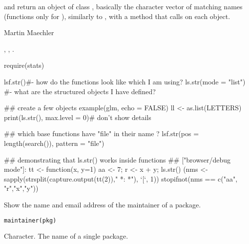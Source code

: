 %
\begin{Value}
 and  return an object of class
, basically the character vector of matching names
(functions only for ), similarly to
, with a  method that calls 
on each object.
\end{Value}
%
\begin{Author}\relax
Martin Maechler
\end{Author}
%
\begin{SeeAlso}\relax
{}, , .
\end{SeeAlso}
%
\begin{Examples}
\begin{ExampleCode}
require(stats)

lsf.str()#- how do the functions look like which I am using?
ls.str(mode = "list") #- what are the structured objects I have defined?

## create a few objects
example(glm, echo = FALSE)
ll <- as.list(LETTERS)
print(ls.str(), max.level = 0)# don't show details

## which base functions have "file" in their name ?
lsf.str(pos = length(search()), pattern = "file")

## demonstrating that  ls.str() works inside functions
## ["browser/debug mode"]:
tt <- function(x, y=1) { aa <- 7; r <- x + y; ls.str() }
(nms <- sapply(strsplit(capture.output(tt(2))," *: *"), `[`, 1))
stopifnot(nms == c("aa", "r","x","y"))
\end{ExampleCode}
\end{Examples}
%
\begin{Description}\relax
Show the name and email address of the maintainer of a package.
\end{Description}
%
\begin{Usage}
\begin{verbatim}
maintainer(pkg)
\end{verbatim}
\end{Usage}
%
\begin{Arguments}
\begin{ldescription}
\item[\code{pkg}] 
Character. The name of a single package.

\end{ldescription}
\end{Arguments}
